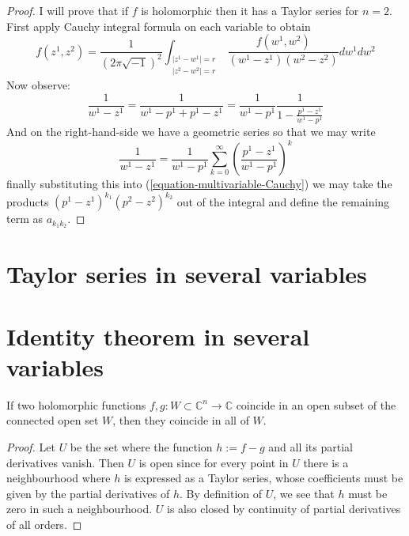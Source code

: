 \begin{proof}
I will prove that if $f$ is holomorphic then it has a Taylor series for $n=2$. 
First apply Cauchy integral formula on each variable to obtain
$$
f(z^1,z^2)=\frac{1}{(2\pi\sqrt{-1})^2}
\int_{\substack{|z^1-w^1|=r \\ |z^2-w^2|=r}}
\frac{f(w^1,w^2)}{(w^1-z^1)(w^2-z^2)}dw^1dw^2
$$
Now observe:
\begin{equation}
\label{equation-multivariable-Cauchy}
\frac{1}{w^1-z^1}=\frac{1}{w^1-p^1+p^1-z^1}
=\frac{1}{w^1-p^1}\frac{1}{1-\frac{p^1-z^1}{w^1-p^1}}
\end{equation}
And on the right-hand-side we have a geometric series so that we may write
$$
\frac{1}{w^1-z^1}
=\frac{1}{w^1-p^1}\sum_{k=0}^\infty\left(\frac{p^1-z^1}{w^1-p^1}\right)^k
$$
finally substituting this into (\ref{equation-multivariable-Cauchy}) we may take
the products $(p^1-z^1)^{k_1}(p^2-z^2)^{k_2}$ out of the integral and define the
remaining term as $a_{k_1k_2}$.
\end{proof}

\section{Taylor series in several variables}
\label{section-Taylor-series-in-several-variables}

\section{Identity theorem in several variables}
\label{section-identity-theorem-in-several-variables}

\begin{theorem}
\label{theorem-identity-several-variables}
\begin{reference}
\cite[Proposition 1.28]{lec}
\end{reference}
If two holomorphic functions $f,g:W\subset \mathbb{C}^n \to \mathbb{C}$ coincide
in an open subset of the connected open set $W$, 
then they coincide in all of $W$.
\end{theorem}

\begin{proof}
Let $U$ be the set where the function $h:=f-g$ and all its partial derivatives
vanish. Then $U$ is open since for every point in $U$ there is a neighbourhood
where $h$ is expressed as a Taylor series, whose coefficients must be given by
the partial derivatives of $h$. By definition of $U$, we see that $h$ must be
zero in such a neighbourhood. $U$ is also closed by continuity of partial
derivatives of all orders. 
\end{proof}

